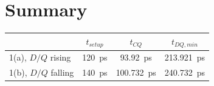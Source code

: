 \section{Summary}

\begin{center}
\begin{tabular}{lccc}
\hline
 & $t_{setup}$ & $t_{CQ}$ & $t_{DQ,min}$ \\
\hline
1(a), $D/Q$ rising  & 120~ps & 93.92~ps & 213.921~ps \\
1(b), $D/Q$ falling & 140~ps & 100.732~ps & 240.732~ps \\
\hline
\end{tabular}
\end{center}
